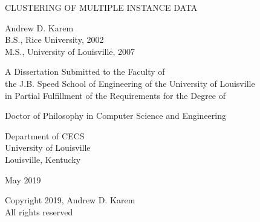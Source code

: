 \documentclass[12pt,dvips]{report}
\numberwithin{equation}{section}
\begin{document}
\thispagestyle{empty}

\begin{center}

{\Large 
CLUSTERING OF MULTIPLE INSTANCE DATA}
\vfill

\singlespacing
Andrew D. Karem \\
B.S., Rice University, 2002 \\
M.S., University of Louisville, 2007

\vfill

A Dissertation Submitted to the Faculty of \\
the J.B. Speed School of Engineering of the University of Louisville \\
in Partial Fulfillment of the Requirements for the Degree of

\vfill

Doctor of Philosophy in Computer Science and Engineering

\vfill

Department of CECS \\
University of Louisville \\
Louisville, Kentucky

\vfill

May 2019  %

\vfill

\end{center}

\restoregeometry
\pagebreak
\thispagestyle{empty}

\begin{center}

Copyright 2019, Andrew D. Karem \\
All rights reserved

\end{center}

\restoregeometry
\pagebreak

\clearpage
\thispagestyle{empty}
\hfill
\clearpage

\pagebreak
{}
\end{document}
